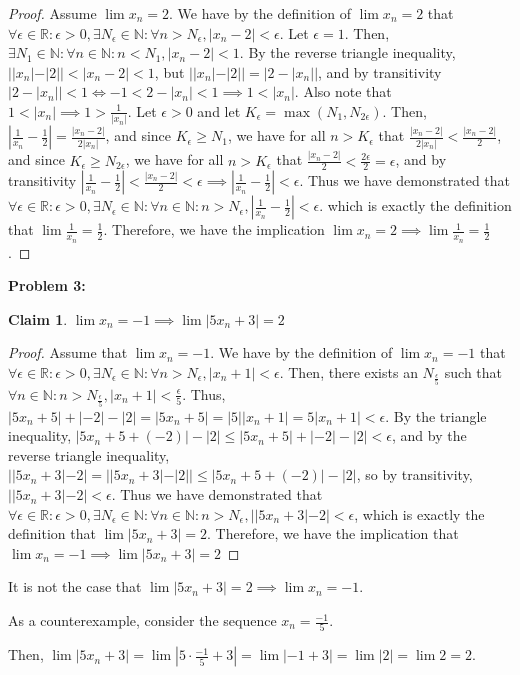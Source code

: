 \documentclass{article}
\newcommand{\reals}{\ensuremath{\mathbb{R}}}
\newcommand{\nats}{\ensuremath{\mathbb{N}}}
\newcommand{\eps}{\ensuremath{\epsilon}}
\newtheorem{clm}{Claim}
\begin{document}
\begin{proof}
	Assume $\lim x_n = 2$.
	We have by the definition of $\lim x_n = 2$
	that $\forall \eps \in \reals : \eps > 0, \exists N_\eps \in \nats: \forall n > N_\eps,
	|x_n - 2| < \eps$.
	Let $\eps = 1$.
	Then, $\exists N_1 \in \nats: \forall n \in \nats: n < N_1, |x_n - 2| < 1$.
	By the reverse triangle inequality,
	$||x_n| - |2|| < | x_n - 2| < 1$,
	but $||x_n| - |2|| = |2 - |x_n||$,
	and by transitivity $|2 - |x_n|| < 1 \iff -1 < 2 - |x_n| < 1 \implies 1 < |x_n|$.
	Also note that $1 < |x_n| \implies 1 > \frac{1}{|x_n|}$.
	Let $\eps > 0$ and let $K_\eps = \max(N_1, N_{2\eps})$.
	Then, $|\frac{1}{x_n} - \frac{1}{2}| = \frac{|x_n - 2|}{2|x_n|}$,
	and since $K_\eps \geq N_1$, we have for all $n > K_\eps$
	that $\frac{|x_n - 2|}{2|x_n|} < \frac{|x_n - 2|}{2}$,
	and since $K_\eps \geq N_{2\eps}$, we have for all $n > K_\eps$
	that $\frac{|x_n - 2|}{2} < \frac{2\eps}{2} = \eps$,
	and by transitivity $|\frac{1}{x_n} - \frac{1}{2}| < \frac{|x_n - 2|}{2} < \eps
	\implies |\frac{1}{x_n} - \frac{1}{2}| < \eps$.
	Thus we have demonstrated that
	$\forall \eps \in \reals: \eps > 0, \exists N_\eps \in \nats: \forall n \in \nats: n > N_\eps,
	|\frac{1}{x_n} - \frac{1}{2}| < \eps$.
	which is exactly the definition that $\lim\frac{1}{x_n} = \frac{1}{2}$.
	Therefore, we have the implication $\lim x_n = 2 \implies \lim \frac{1}{x_n} = \frac{1}{2}$.
\end{proof}

\textbf{Problem 3:}

\begin{clm}
	$\lim x_n = - 1 \implies \lim |5x_n + 3| = 2$
\end{clm}

\begin{proof}
	Assume that $\lim x_n = - 1$.
	We have by the definition of $\lim x_n = -1$
	that $\forall \eps \in \reals : \eps > 0, \exists N_\eps \in \nats: \forall n > N_\eps,
	| x_n + 1 | < \eps$.
	Then, there exists an $N_{\frac{\eps}{5}}$
	such that $\forall n \in \nats : n > N_{\frac{\eps}{5}}, | x_n + 1 | < \frac{\eps}{5}$.
	Thus, $|5x_n + 5| + |-2| - |2| = |5x_n + 5| = |5||x_n + 1| = 5|x_n + 1| < \eps$.
	By the triangle inequality,
	$|5x_n + 5 + (-2)| - |2| \le |5x_n + 5| + |-2| - |2| < \eps$,
	and by the reverse triangle inequality,
	$||5x_n + 3| - 2| = ||5x_n + 3| - |2|| \le |5x_n + 5 + (-2)| - |2|$,
	so by transitivity,
	$||5x_n + 3| - 2| < \eps$.
	Thus we have demonstrated that
	$\forall \eps \in \reals: \eps > 0, \exists N_\eps \in \nats: \forall n \in \nats: n > N_\eps,
	||5x_n + 3| - 2| < \eps$,
	which is exactly the definition that $\lim|5x_n + 3| = 2$.
	Therefore, we have the implication that 
	$\lim x_n = - 1 \implies \lim |5x_n + 3| = 2$
\end{proof}

It is not the case that $\lim |5x_n + 3| = 2 \implies \lim x_n = -1$.

As a counterexample, consider the sequence $x_n = \frac{-1}{5}$.

Then, $\lim |5x_n + 3| = \lim |5 \cdot \frac{-1}{5} + 3| = \lim|-1 + 3| = \lim|2| = \lim 2 = 2$.
\end{document}
